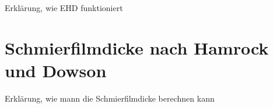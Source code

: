 Erklärung, wie EHD funktioniert

\section{Schmierfilmdicke nach Hamrock und Dowson}
\label{sec:schmierfilmdicke_nach_hamrock_und_dowson}
Erklärung, wie mann die Schmierfilmdicke berechnen kann

